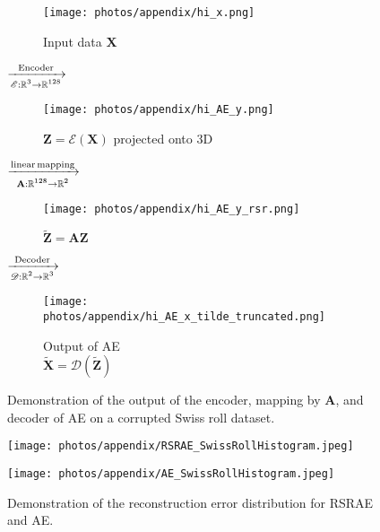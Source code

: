 \documentclass{article} \usepackage{iclr2020_conference,times}
\def\rmA{{\mathbf{A}}}
\def\rmX{{\mathbf{X}}}
\def\rmZ{{\mathbf{Z}}}
\newcommand{\R}{\mathbb{R}}
\begin{document}
\begin{figure}[ht]
\centering
\begin{subfigure}{0.3\textwidth}
\centering
    \texttt{[image: photos/appendix/hi\_x.png]}
    \caption{Input data $\rmX$}
\label{fig:AE_x}
\end{subfigure}
{\large$\xrightarrow[\begin{subarray}{c} \mathscr{E}:\R^3 \rightarrow \R^{128}\end{subarray}]{ \rm{Encoder}  } $}\begin{subfigure}{0.3\textwidth}
\centering
    \texttt{[image: photos/appendix/hi\_AE\_y.png]}
    \caption{$\rmZ=\mathscr{E}(\rmX)$ projected onto 3D}
\label{fig:AE_y}
\end{subfigure}
{\large$\xrightarrow[ \begin{subarray}{c}  \\ \rmA:\R^{128} \rightarrow \R^{2} \end{subarray}   ]{\rm{linear \,mapping}}$}\begin{subfigure}{0.3\textwidth}
\centering
    \texttt{[image: photos/appendix/hi\_AE\_y\_rsr.png]}
    \caption{$\tilde{\rmZ} = \rmA \rmZ$}
\label{fig:AE_yrsr}
\end{subfigure}
{\large$\xrightarrow[\begin{subarray}{c} \mathscr{D}:\R^2 \rightarrow \R^{3}  \end{subarray}]{ \rm{Decoder}  } $}\begin{subfigure}{0.3\textwidth}
\centering
    \texttt{[image: photos/appendix/hi\_AE\_x\_tilde\_truncated.png]}
    \caption{Output of AE \\ $\tilde{\rmX}=\mathscr{D}(\tilde{\rmZ})$}
\label{fig:AE_xtilde}
\end{subfigure}
\caption{{Demonstration of the output of the encoder, mapping by $\rmA$, and decoder of AE on a corrupted Swiss roll dataset.}}
\label{fig:AE_structure}
\end{figure}




\begin{figure}[htbp]
\centering
\begin{minipage}[t]{0.48\textwidth}
\centering
\texttt{[image: photos/appendix/RSRAE\_SwissRollHistogram.jpeg]}
\label{fig:RSRAE_hist}

\end{minipage}
\begin{minipage}[t]{0.48\textwidth}
\centering
\texttt{[image: photos/appendix/AE\_SwissRollHistogram.jpeg]}
\label{fig:AE_hist}
\end{minipage}
\caption{{Demonstration of the reconstruction error distribution for RSRAE and AE.}}
\label{fig:histograms}
\end{figure}
\end{document}
